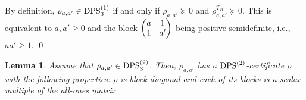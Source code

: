\documentclass[11pt]{article}
\makeatletter
\newcommand{\DPS}{\text{\rm DPS}}
\theoremstyle{plain}
\newtheorem{lemma}[satz]{Lemma}
\renewenvironment{proof}[1][\proofname]{%
  \par
  \pushQED{}%
  \normalfont
  \topsep6\p@\@plus6\p@
  \trivlist
  \item[\hskip\labelsep\itshape #1\@addpunct{.}]%
}{%
  \popQED
  \endtrivlist
}
\makeatother
\begin{document}
\begin{proof}
 By definition,  $\rho_{a,a'}\in \DPS^{(1)}_3$ if and only if $\rho_{a,a'}\succeq 0$ and $\rho_{a,a'}^{T_B}\succeq 0$. This is equivalent to $a,a'\ge 0$ and the block {\tiny $\begin{pmatrix} a&1\cr 1 &a'\end{pmatrix}$} being positive semidefinite, i.e., $aa'\ge 1$.
\qed\end{proof}

\begin{lemma}\label{LExBlocksAreScalar}
Assume that $\rho_{a,a'}\in\DPS^{(2)}_3$. Then, $\rho_{a,a'}$ has  a $\DPS^{(2)}$-certificate $\rho$ with the following properties: $\rho$ is block-diagonal and each of its blocks is a scalar multiple of the all-ones matrix.
\end{lemma}
\end{document}
